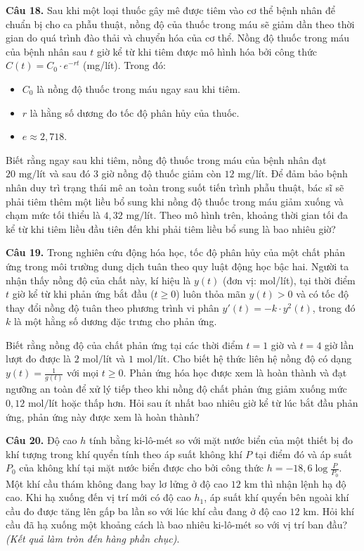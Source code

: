 \documentclass[12pt]{article}
\begin{document}
	\vspace{0.6cm}
	\noindent \textbf{Câu 18.} Sau khi một loại thuốc gây mê được tiêm vào cơ thể bệnh nhân để chuẩn bị cho ca phẫu thuật, nồng độ của thuốc trong máu sẽ giảm dần theo thời gian do quá trình đào thải và chuyển hóa của cơ thể. Nồng độ thuốc trong máu của bệnh nhân sau $t$ giờ kể từ khi tiêm được mô hình hóa bởi công thức $C(t) = C_0 \cdot e^{-rt}$ (mg/lít). Trong đó:
	\begin{itemize}
		\item $C_0$ là nồng độ thuốc trong máu ngay sau khi tiêm.
		\item $r$ là hằng số dương đo tốc độ phân hủy của thuốc.
		\item $e \approx 2{,}718$.
	\end{itemize}
	
	Biết rằng ngay sau khi tiêm, nồng độ thuốc trong máu của bệnh nhân đạt $20\text{ mg/lít}$ và sau đó $3$ giờ nồng độ thuốc giảm còn $12\text{ mg/lít}$. Để đảm bảo bệnh nhân duy trì trạng thái mê an toàn trong suốt tiến trình phẫu thuật, bác sĩ sẽ phải tiêm thêm một liều bổ sung khi nồng độ thuốc trong máu giảm xuống và chạm mức tối thiểu là $4{,}32\text{ mg/lít}$. Theo mô hình trên, khoảng thời gian tối đa kể từ khi tiêm liều đầu tiên đến khi phải tiêm liều bổ sung là bao nhiêu giờ?
	\vspace{0.6cm}
	
	\noindent \textbf{Câu 19.} Trong nghiên cứu động hóa học, tốc độ phân hủy của một chất phản ứng trong môi trường dung dịch tuân theo quy luật động học bậc hai. Người ta nhận thấy nồng độ của chất này, kí hiệu là $y(t)$ (đơn vị: mol/lít), tại thời điểm $t$ giờ kể từ khi phản ứng bắt đầu ($t \ge 0$) luôn thỏa mãn $y(t) > 0$ và có tốc độ thay đổi nồng độ tuân theo phương trình vi phân $y'(t) = -k \cdot y^2(t)$, trong đó $k$ là một hằng số dương đặc trưng cho phản ứng.
	
	Biết rằng nồng độ của chất phản ứng tại các thời điểm $t = 1$ giờ và $t = 4$ giờ lần lượt đo được là $2\text{ mol/lít}$ và $1\text{ mol/lít}$. Cho biết hệ thức liên hệ nồng độ có dạng $y(t) = \frac{1}{g(t)}$ với mọi $t \ge 0$. Phản ứng hóa học được xem là hoàn thành và đạt ngưỡng an toàn để xử lý tiếp theo khi nồng độ chất phản ứng giảm xuống mức $0{,}12\text{ mol/lít}$ hoặc thấp hơn. Hỏi sau ít nhất bao nhiêu giờ kể từ lúc bắt đầu phản ứng, phản ứng này được xem là hoàn thành?

	\vspace{0.6cm}
	\noindent \textbf{Câu 20.} Độ cao $h$ tính bằng ki-lô-mét so với mặt nước biển của một thiết bị đo khí tượng trong khí quyển tính theo áp suất không khí $P$ tại điểm đó và áp suất $P_0$ của không khí tại mặt nước biển được cho bởi công thức $h = -18{,}6 \log \frac{P}{P_0}$. Một khí cầu thám không đang bay lơ lửng ở độ cao $12\text{ km}$ thì nhận lệnh hạ độ cao. Khi hạ xuống đến vị trí mới có độ cao $h_1$, áp suất khí quyển bên ngoài khí cầu đo được tăng lên gấp ba lần so với lúc khí cầu đang ở độ cao $12\text{ km}$. Hỏi khí cầu đã hạ xuống một khoảng cách là bao nhiêu ki-lô-mét so với vị trí ban đầu? \textit{(Kết quả làm tròn đến hàng phần chục)}.
	
\end{document}

